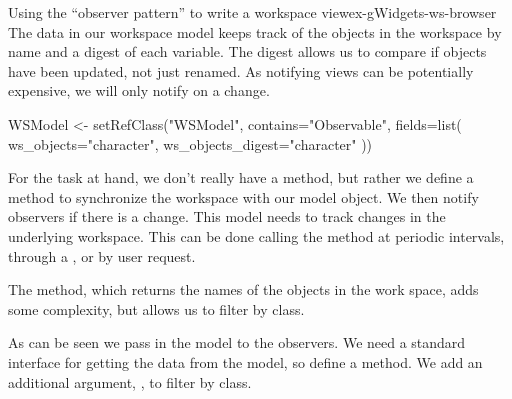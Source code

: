 \begin{example}{Using the ``observer pattern'' to write a workspace view}{ex-gWidgets-ws-browser}
The data in our workspace model keeps track of the objects in the
workspace by name and a digest of each variable. The digest allows us
to compare if objects have been updated, not just renamed. As
notifying views can be potentially expensive, we will only notify on a
change.

\begin{Schunk}
\begin{Sinput}
 WSModel <- setRefClass("WSModel",
                        contains="Observable",
                        fields=list(
                          ws_objects="character",
                          ws_objects_digest="character"
                          ))
\end{Sinput}
\end{Schunk}
%

For the task at hand, we don't really have a  method, but
rather we define a  method to synchronize the workspace
with our model object. We then notify observers if there is a
change. This model needs to track changes in the underlying
workspace. This can be done calling the  method at
periodic intervals, through a , or by user request.

\begin{Schunk}
\end{Schunk}
%
The  method, which returns the names of the
objects in the work space,  adds some complexity, but allows us to
filter by class.

As can be seen we pass in the model to the observers. We need a
standard interface for getting the data from the model, so define a
 method. We add an additional argument, , to
filter by class.


\end{example}
